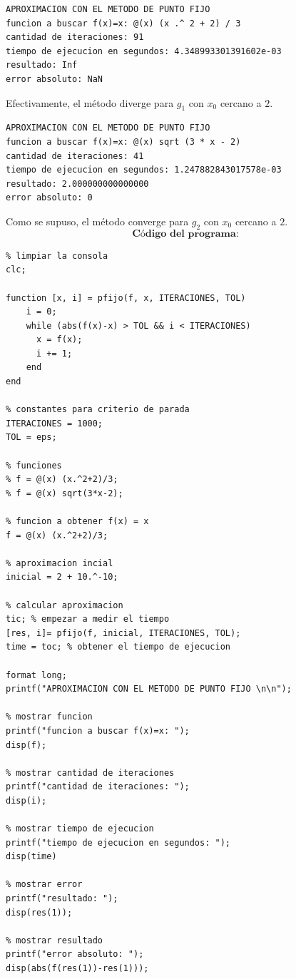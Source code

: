 \documentclass{article}
\begin{document}
\begin{lstlisting}
APROXIMACION CON EL METODO DE PUNTO FIJO
funcion a buscar f(x)=x: @(x) (x .^ 2 + 2) / 3
cantidad de iteraciones: 91
tiempo de ejecucion en segundos: 4.348993301391602e-03
resultado: Inf
error absoluto: NaN
\end{lstlisting}
Efectivamente, el método diverge para $g_1$ con $x_0$ cercano a $2$.
\begin{lstlisting}
APROXIMACION CON EL METODO DE PUNTO FIJO
funcion a buscar f(x)=x: @(x) sqrt (3 * x - 2)
cantidad de iteraciones: 41
tiempo de ejecucion en segundos: 1.247882843017578e-03
resultado: 2.000000000000000
error absoluto: 0
\end{lstlisting}
Como se supuso, el método converge para $g_2$ con $x_0$ cercano a $2$.\\
\vspace{5cm}
\[
\textbf{Código del programa:}
\]
\begin{lstlisting}
% limpiar la consola
clc;

function [x, i] = pfijo(f, x, ITERACIONES, TOL)
    i = 0;
    while (abs(f(x)-x) > TOL && i < ITERACIONES)
      x = f(x);
      i += 1;
    end
end

% constantes para criterio de parada
ITERACIONES = 1000;
TOL = eps;

% funciones
% f = @(x) (x.^2+2)/3;
% f = @(x) sqrt(3*x-2);

% funcion a obtener f(x) = x
f = @(x) (x.^2+2)/3;

% aproximacion incial
inicial = 2 + 10.^-10;

% calcular aproximacion
tic; % empezar a medir el tiempo
[res, i]= pfijo(f, inicial, ITERACIONES, TOL);
time = toc; % obtener el tiempo de ejecucion

format long;
printf("APROXIMACION CON EL METODO DE PUNTO FIJO \n\n");

% mostrar funcion
printf("funcion a buscar f(x)=x: ");
disp(f);

% mostrar cantidad de iteraciones
printf("cantidad de iteraciones: ");
disp(i);

% mostrar tiempo de ejecucion
printf("tiempo de ejecucion en segundos: ");
disp(time)

% mostrar error
printf("resultado: ");
disp(res(1));

% mostrar resultado
printf("error absoluto: ");
disp(abs(f(res(1))-res(1)));
\end{lstlisting}
\end{document}
